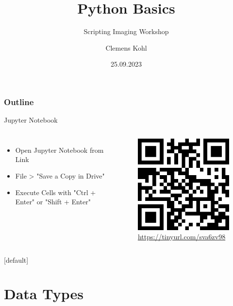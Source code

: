 \documentclass[compress%
,aspectratio=169%
]{beamer}
\title{Python Basics}
\subtitle{Scripting Imaging Workshop}
\author{Clemens Kohl}
\institute{Max Planck Institute for Molecular Genetics}
\date{25.09.2023}
\begin{document}
\maketitle

\begin{frame}
	\frametitle{Outline}
	\tableofcontents[hideallsubsections]
\end{frame}

\begin{frame}{Jupyter Notebook}
\begin{columns}
    \begin{itemize}
    \item Open Jupyter Notebook from Link
    \item File > "Save a Copy in Drive"
    \item Execute Cells with "Ctrl + Enter" or "Shift + Enter"
\end{itemize}
    \begin{figure}
    \centering
    \includegraphics[width = 0.7\linewidth]{img/link.png}
    \caption{\alert{\url{https://tinyurl.com/sva6zv98}}}
\end{figure}
\end{columns}
\end{frame}
[default]

\section{Data Types}
\end{document}
